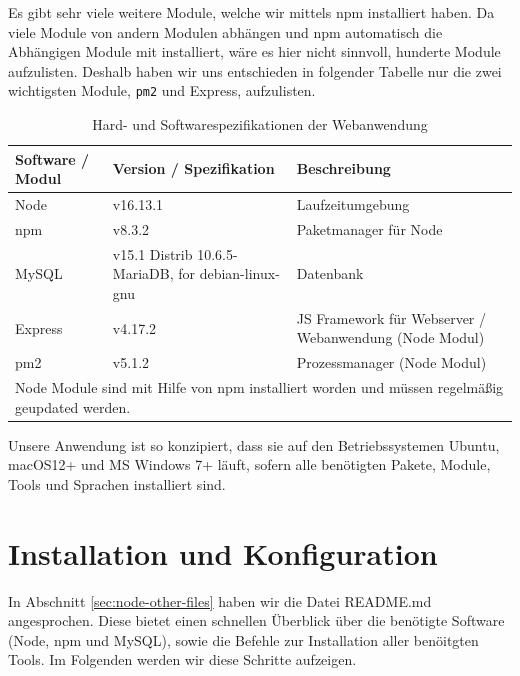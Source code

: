 Es gibt sehr viele weitere Module, welche wir mittels npm installiert haben. Da viele Module von andern Modulen abhängen und npm automatisch die Abhängigen Module mit installiert, wäre es hier nicht sinnvoll, hunderte Module aufzulisten. Deshalb haben wir uns entschieden in folgender Tabelle nur die zwei wichtigsten Module, \verb|pm2| und Express, aufzulisten.

\begin{table}[H]
    \caption{Hard- und Softwarespezifikationen der Webanwendung}
    \label{tab:node-specs}
    \setlength{\tabcolsep}{3pt}
    \begin{tabular}{|p{70pt}|p{120pt}|p{180pt}|}
        \hline
        Software / Modul & Version / Spezifikation                            & Beschreibung                                           \\
        \hline\hline
        Node             & v16.13.1                                           & Laufzeitumgebung                                       \\
        \hline
        npm              & v8.3.2                                             & Paketmanager für Node                                  \\
        \hline
        MySQL            & v15.1 Distrib 10.6.5-MariaDB, for debian-linux-gnu & Datenbank                                              \\
        \hline
        Express          & v4.17.2                                            & JS Framework für Webserver / Webanwendung (Node Modul) \\
        \hline
        pm2              & v5.1.2                                             & Prozessmanager (Node Modul)                            \\
        \hline
        \multicolumn{3}{p{400pt}}{Node Module sind mit Hilfe von npm installiert worden und müssen regelmäßig geupdated werden.}
    \end{tabular}
\end{table}

Unsere Anwendung ist so konzipiert, dass sie auf den Betriebssystemen Ubuntu, macOS12+ und MS Windows 7+ läuft, sofern alle benötigten Pakete, Module, Tools und Sprachen installiert sind.\\

\newpage
\section{Installation und Konfiguration}
\label{sec:nodechapter-installation}
In Abschnitt \ref{sec:node-other-files} haben wir die Datei README.md angesprochen. Diese bietet einen schnellen Überblick über die benötigte Software (Node, npm und MySQL), sowie die Befehle zur Installation aller benöitgten Tools. Im Folgenden werden wir diese Schritte aufzeigen.

